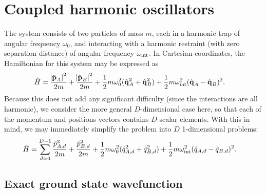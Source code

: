 \chapter{Coupled harmonic oscillators}

\label{chap:oscillators}


The system consists of two particles of mass $m$, each in a harmonic trap of angular frequency $\omega_0$, and interacting with a harmonic restraint (with zero separation distance) of angular frequency $\omega_\text{int}$.
In Cartesian coordinates, the Hamiltonian for this system may be expressed as
\begin{align}
	\hat{H}
	&= \frac{\abs{\hat{\bm{\mathbf{p}}}_A}^2}{2 m} + \frac{\abs{\hat{\bm{\mathbf{p}}}_B}^2}{2 m}
		+ \frac{1}{2} m \omega_0^2 (\hat{\bm{\mathbf{q}}}_A^2 + \hat{\bm{\mathbf{q}}}_B^2)
		+ \frac{1}{2} m \omega_\text{int}^2 (\hat{\bm{\mathbf{q}}}_A - \hat{\bm{\mathbf{q}}}_B)^2.
\end{align}
Because this does not add any significant difficulty (since the interactions are all harmonic), we consider the more general $D$-dimensional case here, so that each of the momentum and positions vectors contains $D$ scalar elements.
With this in mind, we may immediately simplify the problem into $D$ 1-dimensional problems:
\begin{align}
	\hat{H}
	&= \sum_{d=0}^{D-1}
			\frac{\hat{p}_{A,d}^2}{2 m} + \frac{\hat{p}_{B,d}^2}{2 m}
			+ \frac{1}{2} m \omega_0^2 (\hat{q}_{A,d}^2 + \hat{q}_{B,d}^2)
			+ \frac{1}{2} m \omega_\text{int}^2 (\hat{q}_{A,d} - \hat{q}_{B,d})^2.
\end{align}


\section{Exact ground state wavefunction}

